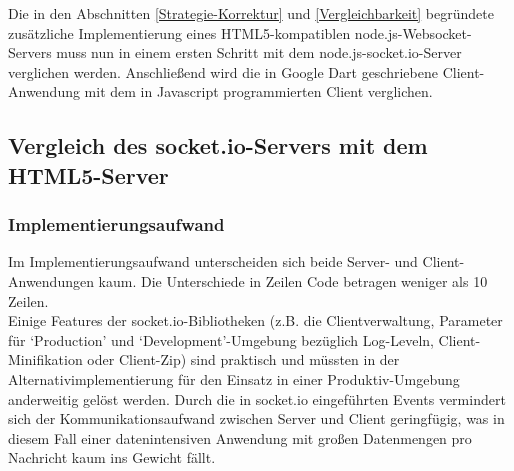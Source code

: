 Die in den Abschnitten  \ref{Strategie-Korrektur} und \ref{Vergleichbarkeit} begründete zusätzliche Implementierung eines HTML5-kompatiblen node.js-Websocket-Servers muss nun in einem ersten Schritt mit dem node.js-socket.io-Server verglichen werden. Anschließend wird die in Google Dart geschriebene Client-Anwendung mit dem in Javascript programmierten Client verglichen.
\subsection{Vergleich des socket.io-Servers mit dem HTML5-Server}\label{socket.io- vs html5-Server}
\subsubsection{Implementierungsaufwand}
Im Implementierungsaufwand unterscheiden sich beide Server- und Client-Anwendungen kaum. Die Unterschiede in Zeilen Code betragen weniger als 10 Zeilen.\\
Einige Features der socket.io-Bibliotheken (z.B. die Clientverwaltung, Parameter für ‘Production’ und ‘Development’-Umgebung bezüglich Log-Leveln, Client-Minifikation oder Client-Zip) sind praktisch und müssten in der Alternativimplementierung für den Einsatz in einer Produktiv-Umgebung anderweitig gelöst werden. Durch die in socket.io eingeführten Events vermindert sich der Kommunikationsaufwand zwischen Server und Client geringfügig, was in diesem Fall einer datenintensiven Anwendung mit großen Datenmengen pro Nachricht kaum ins Gewicht fällt.
